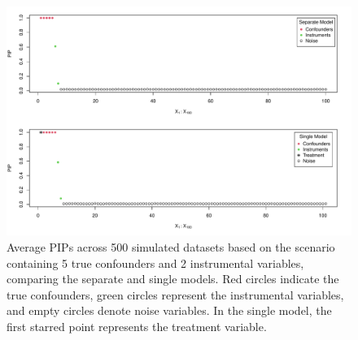 \begin{figure}[htbp]
\includegraphics[width=\linewidth]{fig/pip_s3.pdf}
\caption{Average PIPs across 500 simulated datasets based on the scenario containing 5 true confounders and 2 instrumental variables, comparing the separate and single models. Red circles indicate the true confounders, green circles represent the instrumental variables, and empty circles denote noise variables. In the single model, the first starred point represents the treatment variable.} \label{Fig:A3}
\end{figure}


